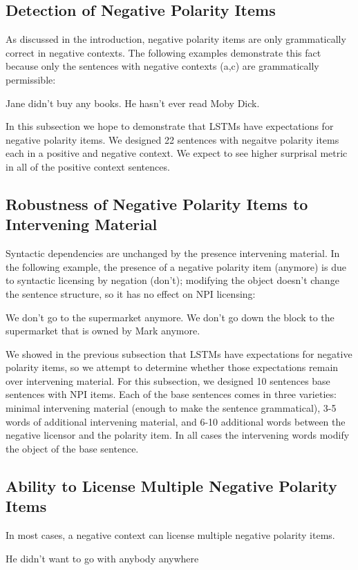 \documentclass[11pt]{article}
\begin{document}
\subsection{Detection of Negative Polarity Items}
As discussed in the introduction, negative polarity items are only grammatically correct in negative contexts. The following examples demonstrate this fact because only the sentences with negative contexts (a,c) are grammatically permissible:
\begin{exe}
[]
\begin{xlist}
\ex Jane didn't buy any books.
\ex He hasn't ever read Moby Dick.
\end{xlist}
\end{exe}
In this subsection we hope to demonstrate that LSTMs have expectations for negative polarity items. We designed 22 sentences with negaitve polarity items each in a positive and negative context. We expect to see higher surprisal metric in all of the positive context sentences. 
\subsection{Robustness of Negative Polarity Items to Intervening Material}
Syntactic dependencies are unchanged by the presence intervening material. In the following example, the presence of a negative polarity item (anymore) is due to syntactic licensing by negation (don't); modifying the object doesn't change the sentence structure, so it has no effect on NPI licensing:
\begin{exe}
[]
\begin{xlist}
\ex We don't go to the supermarket anymore.
\ex We don't go down the block to the supermarket that is owned by Mark anymore. 
\end{xlist}
\end{exe}
We showed in the previous subsection that LSTMs have expectations for negative polarity items, so we attempt to determine whether those expectations remain over intervening material. For this subsection, we designed 10 sentences base sentences with NPI items. Each of the base sentences comes in three varieties: minimal intervening material (enough to make the sentence grammatical), 3-5 words of additional intervening material, and 6-10 additional words between the negative licensor and the polarity item. In all cases the intervening words modify the object of the base sentence.
\subsection{Ability to License Multiple Negative Polarity Items}
In most cases, a negative context can license multiple negative polarity items.
\begin{exe}
[]
\begin{xlist}
\ex He didn't want to go with anybody anywhere
\end{xlist}
\end{exe}
\end{document}
